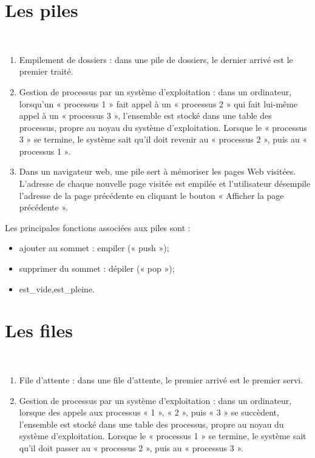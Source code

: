 \documentclass[10pt,fleqn]{article} %
\begin{document}
\section{Les piles}
\begin{exemple}
~\\
\begin{enumerate}
\item Empilement de dossiers : dans une pile de dossiers, le dernier arrivé est le premier traité.

\item Gestion de processus par un système d’exploitation : dans un ordinateur, lorsqu’un « processus 1 » fait appel à un « processus 2 » qui fait lui-même appel à un « processus 3 », l’ensemble est stocké dans une table des processus, propre au noyau du système d’exploitation. Lorsque le « processus 3 » se termine, le système sait qu’il doit revenir au « processus 2 », puis au « processus 1 ». 
\item Dans un navigateur web, une pile sert à mémoriser les pages Web visitées. L'adresse de chaque nouvelle page visitée est empilée et l'utilisateur désempile l'adresse de la page précédente en cliquant le bouton « Afficher la page précédente ».
\end{enumerate}
\end{exemple}

\begin{rem}
Les principales fonctions associées aux piles sont : 
\begin{itemize}[label=,font=\color{ocre}] 
\item ajouter au sommet : empiler (« push »);
\item supprimer du sommet : dépiler (« pop »);
\item est\_vide,est\_pleine.
\end{itemize}
\end{rem}

\section{Les files}
\begin{exemple}
~\\
\begin{enumerate}
\item File d’attente : dans une file d’attente, le premier arrivé est le premier servi.
\item Gestion de processus par un système d’exploitation : dans un ordinateur, lorsque des appels aux processus « 1 », « 2 », puis « 3 » se succèdent, l’ensemble est stocké dans une table des processus, propre au noyau du système d’exploitation. Lorsque le « processus 1 » se termine, le système sait qu’il doit passer au « processus 2 », puis au « processus 3 ».
\end{enumerate}
\end{exemple}
\end{document}
